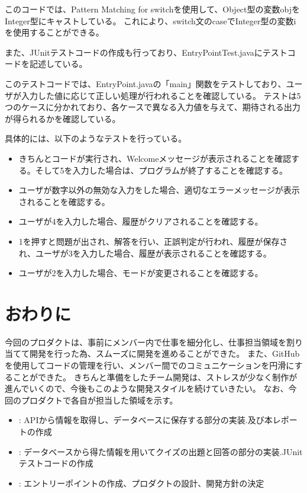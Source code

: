 \documentclass[uplatex,dvipdfmx,a4paper]{jsarticle}
\begin{document}
このコードでは、Pattern Matching for switchを使用して、Object型の変数objをInteger型にキャストしている。
これにより、switch文のcaseでInteger型の変数iを使用することができる。

\par また、JUnitテストコードの作成も行っており、EntryPointTest.javaにテストコードを記述している。

\par このテストコードでは、EntryPoint.javaの「main」関数をテストしており、ユーザが入力した値に応じて正しい処理が行われることを確認している。
テストは5つのケースに分かれており、各ケースで異なる入力値を与えて、期待される出力が得られるかを確認している。
\par 具体的には、以下のようなテストを行っている。
\begin{itemize}
  \item きちんとコードが実行され、Welcomeメッセージが表示されることを確認する。そして5を入力した場合は、プログラムが終了することを確認する。
  \item ユーザが数字以外の無効な入力をした場合、適切なエラーメッセージが表示されることを確認する。
  \item ユーザが4を入力した場合、履歴がクリアされることを確認する。
  \item 1を押すと問題が出され、解答を行い、正誤判定が行われ、履歴が保存され、ユーザが3を入力した場合、履歴が表示されることを確認する。
  \item ユーザが2を入力した場合、モードが変更されることを確認する。
\end{itemize}







\section{おわりに}
今回のプロダクトは、事前にメンバー内で仕事を細分化し、仕事担当領域を割り当てて開発を行った為、スムーズに開発を進めることができた。
また、GitHubを使用してコードの管理を行い、メンバー間でのコミュニケーションを円滑にすることができた。
きちんと準備をしたチーム開発は、ストレスが少なく制作が進んでいくので、今後もこのような開発スタイルを続けていきたい。
なお、今回のプロダクトで各自が担当した領域を示す。
\begin{itemize}
  \item : APIから情報を取得し、データベースに保存する部分の実装.及び本レポートの作成
  \item : データベースから得た情報を用いてクイズの出題と回答の部分の実装.JUnitテストコードの作成
  \item : エントリーポイントの作成、プロダクトの設計、開発方針の決定
\end{itemize}
\end{document}
